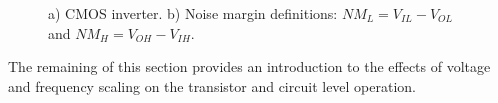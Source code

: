 \begin{figure}[!htb]
    \centering
  \begin{subfigmatrix}{2}
  \end{subfigmatrix}
  \caption{a) CMOS inverter. b) Noise margin definitions: $NM_L=V_{IL}-V_{OL}$ and $NM_H=V_{OH}-V_{IH}$.}
\end{figure}

The remaining of this section provides an introduction to the effects of voltage and frequency scaling on the transistor and circuit level operation.


